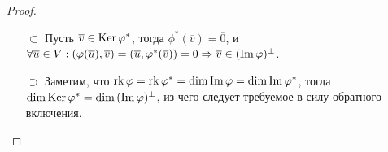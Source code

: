 \begin{proof}~
	\begin{itemize}
		\item[$\subset$] Пусть $\overline{v} \in \operatorname{Ker}{\varphi^*}$, тогда $\phi^*(\overline{v}) = \overline{0}$, и $\forall \overline{u} \in V: (\phi(\overline{u}), \overline{v}) \hm{=} (\overline{u}, \phi^*(\overline{v})) = 0 \ra \overline{v} \in (\im{\phi})^\perp$.
		
		\item[$\supset$] Заметим, что $\operatorname{rk}{\varphi} = \operatorname{rk}{\varphi^*} = \dim{\operatorname{Im}{\ensuremath{\varphi}}} = \dim{\operatorname{Im}{\ensuremath{\varphi}^*}}$, тогда $\dim{\operatorname{Ker}{\ensuremath{\varphi}^*}} = \dim{(\operatorname{Im}{\ensuremath{\varphi}})^\perp}$, из чего следует требуемое в силу обратного включения.\qedhere
	\end{itemize}
\end{proof}

